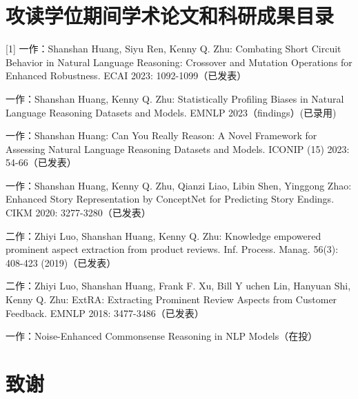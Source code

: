 \documentclass[UTF8,a4paper,12pt]{ctexart}
\numberwithin{equation}{section}
\begin{document}




\newpage
{}

\section*{攻读学位期间学术论文和科研成果目录}

[1] 一作：Shanshan Huang, Siyu Ren, Kenny Q. Zhu:
Combating Short Circuit Behavior in Natural Language Reasoning: Crossover and 
Mutation Operations for Enhanced Robustness. ECAI 2023: 1092-1099（已发表）

\noindent[2]一作：Shanshan Huang, Kenny Q. Zhu:
Statistically Profiling Biases in Natural Language Reasoning Datasets
 and Models. EMNLP 2023（findings）(已录用)

\noindent[3]一作：Shanshan Huang:
Can You Really Reason: A Novel Framework for Assessing Natural 
Language Reasoning Datasets and Models. ICONIP (15) 2023: 54-66（已发表）

\noindent[4]一作：Shanshan Huang, Kenny Q. Zhu, Qianzi Liao, Libin Shen, Yinggong Zhao:
Enhanced Story Representation by ConceptNet for 
Predicting Story Endings. CIKM 2020: 3277-3280（已发表）

\noindent[5]二作：Zhiyi Luo, Shanshan Huang, Kenny Q. Zhu:
Knowledge empowered prominent aspect extraction from 
product reviews. Inf. Process. Manag. 56(3): 408-423 (2019)（已发表）

\noindent[6]二作：Zhiyi Luo, Shanshan Huang, Frank F. Xu, Bill Y
uchen Lin, Hanyuan Shi, Kenny Q. Zhu:
ExtRA: Extracting Prominent Review Aspects 
from Customer Feedback. EMNLP 2018: 3477-3486（已发表）

\noindent[7]一作：Noise-Enhanced Commonsense Reasoning in NLP Models（在投）

\newpage
{}


\section*{致\qquad 谢}
\end{document}
